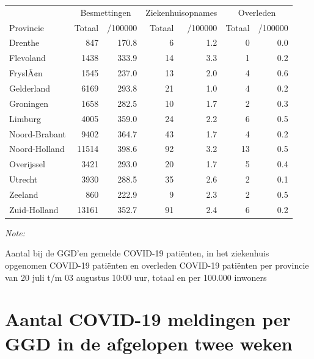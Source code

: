\documentclass[
  english,
  man,floatsintext]{apa6}
\begin{document}
\begin{table}
\centering
\begin{threeparttable}
\begin{tabular}{lrrrrrr}
\toprule
\multicolumn{1}{c}{ } & \multicolumn{2}{c}{Besmettingen} & \multicolumn{2}{c}{Ziekenhuisopnames} & \multicolumn{2}{c}{Overleden} \\
\cmidrule(l{3pt}r{3pt}){2-3} \cmidrule(l{3pt}r{3pt}){4-5} \cmidrule(l{3pt}r{3pt}){6-7}
Provincie & Totaal & /100000 & Totaal & /100000 & Totaal & /100000\\
\midrule
Drenthe & 847 & 170.8 & 6 & 1.2 & 0 & 0.0\\
Flevoland & 1438 & 333.9 & 14 & 3.3 & 1 & 0.2\\
FryslÃ¢n & 1545 & 237.0 & 13 & 2.0 & 4 & 0.6\\
Gelderland & 6169 & 293.8 & 21 & 1.0 & 4 & 0.2\\
Groningen & 1658 & 282.5 & 10 & 1.7 & 2 & 0.3\\
Limburg & 4005 & 359.0 & 24 & 2.2 & 6 & 0.5\\
Noord-Brabant & 9402 & 364.7 & 43 & 1.7 & 4 & 0.2\\
Noord-Holland & 11514 & 398.6 & 92 & 3.2 & 13 & 0.5\\
Overijssel & 3421 & 293.0 & 20 & 1.7 & 5 & 0.4\\
Utrecht & 3930 & 288.5 & 35 & 2.6 & 2 & 0.1\\
Zeeland & 860 & 222.9 & 9 & 2.3 & 2 & 0.5\\
Zuid-Holland & 13161 & 352.7 & 91 & 2.4 & 6 & 0.2\\
\bottomrule
\end{tabular}
\begin{tablenotes}
\item \textit{Note: } 
\item Aantal bij de GGD’en gemelde COVID-19 patiënten, in het ziekenhuis opgenomen COVID-19 patiënten en overleden COVID-19 patiënten per provincie van 20 juli t/m 03 augustus 10:00 uur, totaal en per 100.000 inwoners
\end{tablenotes}
\end{threeparttable}
\end{table}

\newpage

\hypertarget{aantal-covid-19-meldingen-per-ggd-in-de-afgelopen-twee-weken}{%
\section{Aantal COVID-19 meldingen per GGD in de afgelopen twee weken}\label{aantal-covid-19-meldingen-per-ggd-in-de-afgelopen-twee-weken}}
\end{document}
